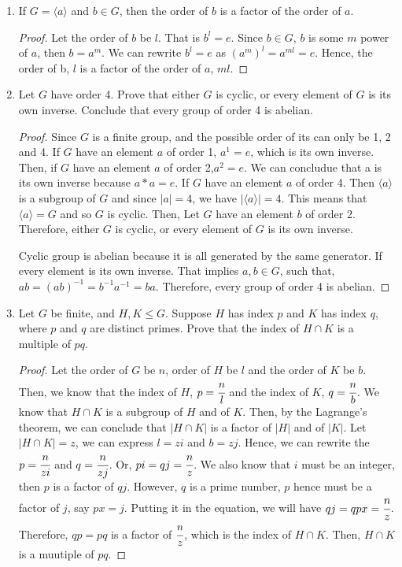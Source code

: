 \documentclass[12pt]{article}
\begin{document}
	\begin{enumerate}
		
		\item If $G = \langle a\rangle$ and $b \in G$, then the order of $b$ is a factor of the order of $a$.
		\begin{proof}
			Let the order of $b$ be $l$. That is $b^l=e$. Since $b \in G$, $b$ is some $m$ power of $a$, then $b = a^m$. We can rewrite $b^l =e$ as $(a^m)^l = a^{ml}= e$. Hence, the order of b, $l$ is a factor of the order of $a$, $ml$.
			\end{proof}
		\item
		Let $G$ have order 4. Prove that either $G$ is cyclic, or every element of $G$ is its own inverse. Conclude that every group of order 4 is abelian.
		\begin{proof}
		Since $G$ is a finite group, and the possible order of its can only be 1, 2 and 4.	If $G$ have an element $a$ of order 1, $a^1 = e$, which is its own inverse. Then, if $G$ have an element $a$ of order 2,$a^2= e$. We can concludue that a is its own inverse because $a*a = e$. If $G$ have an element $a$ of order 4. Then $\langle a \rangle$ is a subgroup of $G$ and since $|a|=4$, we have $|\langle a \rangle|=4$. This means that $\langle a \rangle=G$ and so $G$ is cyclic. Then, Let $G$ have an element $b$ of order 2. Therefore,  either $G$ is cyclic, or every element of $G$ is its own inverse. 
		
		Cyclic group is abelian because it is all generated by the same generator. If every element is its own inverse. That implies $a,b \in G$, such that, $ab = (ab)^{-1} = b^{-1}a^{-1} =ba$. Therefore, every group of order 4 is abelian.
			
		\end{proof}
		\item
		Let $G$ be finite, and $H, K \leq G$. Suppose $H$ has index $p$ and $K$ has index $q$, where $p$ and $q$ are distinct primes. Prove that the index of $H \cap K$ is a multiple of $pq$.

		\begin{proof}
			Let the order of $G$ be $n$, order of $H$ be $l$ and the order of $K$ be $b$. Then, we know that the index of $H$, $p=\cfrac{n}{l}$ and the index of $K$, $q = \cfrac{n}{b}$. We know that $H \cap K$ is a subgroup of $H$ and of $K$. Then, by the Lagrange's theorem, we can conclude that $|H \cap K|$ is a factor of $|H|$ and of $|K|$. Let 	$|H \cap K| = z$, we can express $l = zi$ and $b=zj$. Hence, we can rewrite the $p = \cfrac{n}{zi}$ and $q = \cfrac{n}{zj}$. Or, $pi=qj = \cfrac{n}{z}$. We also know that $i$ must be an integer, then $p$ is a factor of $qj$. However, $q$ is a prime number, $p$ hence must be a factor of $j$, say $px =j$. Putting it in the equation, we will have $qj  = qpx= \cfrac{n}{z}$. Therefore, $qp = pq$ is a factor of $\cfrac{n}{z}$, which is the index of $H \cap K$. Then, $H \cap K$ is a muutiple of $pq$.
			
				
			\end{proof}
	
	\end{enumerate}
\end{document}
